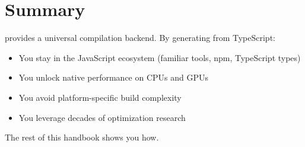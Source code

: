 \section{Summary}

 provides a universal compilation backend. By generating   from TypeScript:
\begin{itemize}[noitemsep]
  \item You stay in the JavaScript ecosystem (familiar tools, npm, TypeScript types)
  \item You unlock native performance on CPUs and GPUs
  \item You avoid platform-specific build complexity
  \item You leverage decades of  optimization research
\end{itemize}

The rest of this handbook shows you how.
